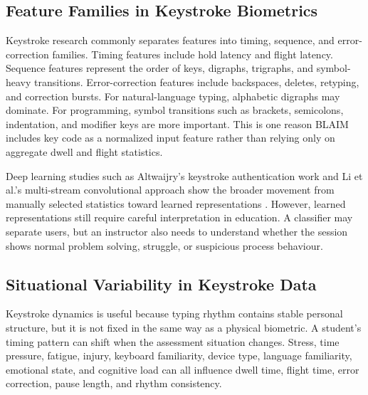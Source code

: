 \subsection{Feature Families in Keystroke Biometrics}
\label{subsec:feature-families}

Keystroke research commonly separates features into timing, sequence, and error-correction families. Timing features include hold latency and flight latency. Sequence features represent the order of keys, digraphs, trigraphs, and symbol-heavy transitions. Error-correction features include backspaces, deletes, retyping, and correction bursts. For natural-language typing, alphabetic digraphs may dominate. For programming, symbol transitions such as brackets, semicolons, indentation, and modifier keys are more important. This is one reason BLAIM includes key code as a normalized input feature rather than relying only on aggregate dwell and flight statistics.

Deep learning studies such as Altwaijry's keystroke authentication work and Li et al.'s multi-stream convolutional approach show the broader movement from manually selected statistics toward learned representations \cite{altwaijry2020deep,li2020keystroke}. However, learned representations still require careful interpretation in education. A classifier may separate users, but an instructor also needs to understand whether the session shows normal problem solving, struggle, or suspicious process behaviour.

\subsection{Situational Variability in Keystroke Data}
\label{subsec:situational-variability}

Keystroke dynamics is useful because typing rhythm contains stable personal structure, but it is not fixed in the same way as a physical biometric. A student's timing pattern can shift when the assessment situation changes. Stress, time pressure, fatigue, injury, keyboard familiarity, device type, language familiarity, emotional state, and cognitive load can all influence dwell time, flight time, error correction, pause length, and rhythm consistency.

